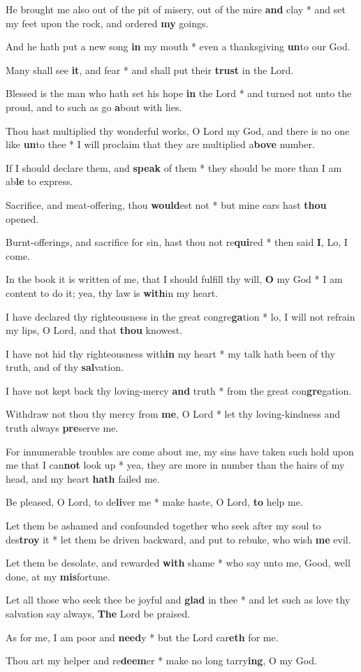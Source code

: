\begin{multicols}{2}
	He brought me also out of the pit of misery, out of the mire \textbf{and} clay * and set my feet upon the rock, and ordered \textbf{my} goings.
	
	And he hath put a new song \textbf{in} my mouth * even a thanksgiving \textbf{un}to our God.
	
	Many shall see \textbf{it}, and fear * and shall put their \textbf{trust} in the Lord.
	
	Blessed is the man who hath set his hope \textbf{in} the Lord * and turned not unto the proud, and to such as go \textbf{a}bout with lies.
	
	Thou hast multiplied thy wonderful works, O Lord my God, and there is no one like \textbf{un}to thee * I will proclaim that they are multiplied a\textbf{bove} number.
	
	If I should declare them, and \textbf{speak} of them * they should be more than I am ab\textbf{le} to express.
	
	Sacrifice, and meat-offering, thou \textbf{would}est not * but mine ears hast \textbf{thou} opened.
	
	Burnt-offerings, and sacrifice for sin, hast thou not re\textbf{qui}red * then said \textbf{I}, Lo, I come.
	
	In the book it is written of me, that I should fulfill thy will, \textbf{O} my God * I am content to do it; yea, thy law is \textbf{with}in my heart.
	
	I have declared thy righteousness in the great congre\textbf{ga}tion * lo, I will not refrain my lips, O Lord, and that \textbf{thou} knowest.
	
	I have not hid thy righteousness with\textbf{in} my heart * my talk hath been of thy truth, and of thy \textbf{sal}vation.
	
	I have not kept back thy loving-mercy \textbf{and} truth * from the great con\textbf{gre}gation.
	
	Withdraw not thou thy mercy from \textbf{me}, O Lord * let thy loving-kindness and truth always \textbf{pre}serve me.
	
	For innumerable troubles are come about me, my sins have taken such hold upon me that I can\textbf{not} look up * yea, they are more in number than the hairs of my head, and my heart \textbf{hath} failed me.
	
	Be pleased, O Lord, to de\textbf{li}ver me * make haste, O Lord, \textbf{to} help me.
	
	Let them be ashamed and confounded together who seek after my soul to des\textbf{troy} it * let them be driven backward, and put to rebuke, who wish \textbf{me} evil.
	
	Let them be desolate, and rewarded \textbf{with} shame * who say unto me, Good, well done, at my \textbf{mis}fortune.
	
	Let all those who seek thee be joyful and \textbf{glad} in thee * and let such as love thy salvation say always, \textbf{The} Lord be praised.
	
	As for me, I am poor and \textbf{need}y * but the Lord car\textbf{eth} for me.
	
	Thou art my helper and re\textbf{deem}er * make no long tarry\textbf{ing}, O my God.
\end{multicols}